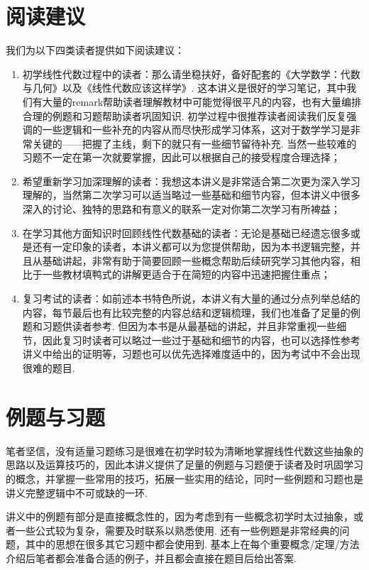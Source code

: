 \section*{阅读建议}

我们为以下四类读者提供如下阅读建议：
\begin{enumerate}
    \item 初学线性代数过程中的读者：那么请坐稳扶好，备好配套的《大学数学：代数与几何》以及《线性代数应该这样学》. 这本讲义是很好的学习笔记，其中我们有大量的remark帮助读者理解教材中可能觉得很平凡的内容，也有大量编排合理的例题和习题帮助读者巩固知识. 初学过程中很推荐读者阅读我们反复强调的一些逻辑和一些补充的内容从而尽快形成学习体系，这对于数学学习是非常关键的——把握了主线，剩下的就只有一些细节留待补充. 当然一些较难的习题不一定在第一次就要掌握，因此可以根据自己的接受程度合理选择；

    \item 希望重新学习加深理解的读者：我想这本讲义是非常适合第二次更为深入学习理解的，当然第二次学习可以适当略过一些基础和细节内容，但本讲义中很多深入的讨论、独特的思路和有意义的联系一定对你第二次学习有所裨益；

    \item 在学习其他方面知识时回顾线性代数基础的读者：无论是基础已经遗忘很多或是还有一定印象的读者，本讲义都可以为您提供帮助，因为本书逻辑完整，并且从基础讲起，非常有助于简要回顾一些概念帮助后续研究学习其他内容，相比于一些教材填鸭式的讲解更适合于在简短的内容中迅速把握住重点；

    \item 复习考试的读者：如前述本书特色所说，本讲义有大量的通过分点列举总结的内容，每节最后也有比较完整的内容总结和逻辑梳理，我们也准备了足量的例题和习题供读者参考. 但因为本书是从最基础的讲起，并且非常重视一些细节，因此复习时读者可以略过一些过于基础和细节的内容，也可以选择性参考讲义中给出的证明等，习题也可以优先选择难度适中的，因为考试中不会出现很难的题目.
\end{enumerate}

\section*{例题与习题}

笔者坚信，没有适量习题练习是很难在初学时较为清晰地掌握线性代数这些抽象的思路以及运算技巧的，因此本讲义提供了足量的例题与习题便于读者及时巩固学习的概念，并掌握一些常用的技巧，拓展一些实用的结论，同时一些例题和习题也是讲义完整逻辑中不可或缺的一环.

讲义中的例题有部分是直接概念性的，因为考虑到有一些概念初学时太过抽象，或者一些公式较为复杂，需要及时联系以熟悉使用. 还有一些例题是非常经典的问题，其中的思想在很多其它习题中都会使用到. 基本上在每个重要概念/定理/方法介绍后笔者都会准备合适的例子，并且都会直接在题目后给出答案.

